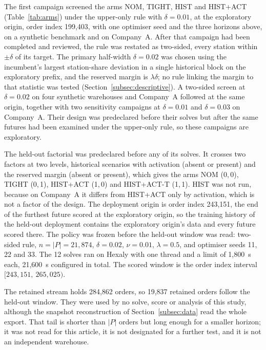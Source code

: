 The first campaign screened the arms NOM, TIGHT, HIST and HIST+ACT (Table~\ref{tab:arms}) under the upper-only rule with $\delta=0.01$, at the exploratory origin, order index 199,403, with one optimiser seed and the three horizons above, on a synthetic benchmark and on Company~A. After that campaign had been completed and reviewed, the rule was restated as two-sided, every station within $\pm\delta$ of its target. The primary half-width $\delta=0.02$ was chosen using the incumbent's largest station-share deviation in a single historical block on the exploratory prefix, and the reserved margin is $\lambda\delta$; no rule linking the margin to that statistic was tested (Section~\ref{subsec:descriptive}). A two-sided screen at $\delta=0.02$ on four synthetic warehouses and Company~A followed at the same origin, together with two sensitivity campaigns at $\delta=0.01$ and $\delta=0.03$ on Company~A. Their design was predeclared before their solves but after the same futures had been examined under the upper-only rule, so these campaigns are exploratory. 

The held-out factorial was predeclared before any of its solves. It crosses two factors at two levels, historical scenarios with activation (absent or present) and the reserved margin (absent or present), which gives the arms NOM (0,\,0), TIGHT (0,\,1), HIST+ACT (1,\,0) and HIST+ACT-T (1,\,1). HIST was not run, because on Company~A it differs from HIST+ACT only by activation, which is not a factor of the design. The deployment origin is order index 243,151, the end of the furthest future scored at the exploratory origin, so the training history of the held-out deployment contains the exploratory origin's data and every future scored there. The policy was frozen before the held-out window was read: two-sided rule, $n=|P|=21{,}874$, $\delta=0.02$, $\nu=0.01$, $\lambda=0.5$, and optimiser seeds 11, 22 and 33. The 12 solves ran on Hexaly with one thread and a limit of 1,800~s each, 21,600~s configured in total. The scored window is the order index interval $[243{,}151,\ 265{,}025)$.

The retained stream holds 284,862 orders, so 19,837 retained orders follow the held-out window. They were used by no solve, score or analysis of this study, although the snapshot reconstruction of Section~\ref{subsec:data} read the whole export. That tail is shorter than $|P|$ orders but long enough for a smaller horizon; it was not read for this article, it is not designated for a further test, and it is not an independent warehouse.

